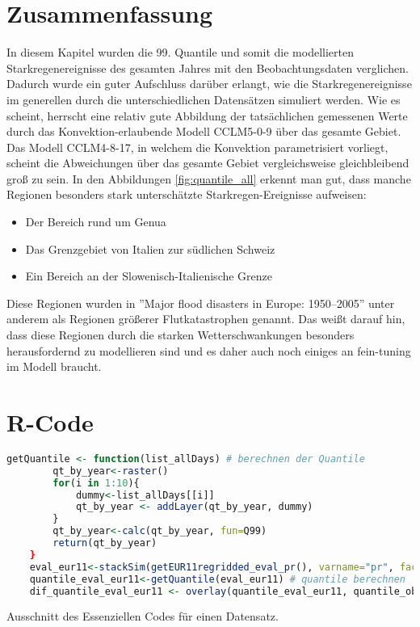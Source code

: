 \section{Zusammenfassung}
In diesem Kapitel wurden die 99. Quantile und somit die modellierten Starkregenereignisse des gesamten Jahres mit den Beobachtungsdaten verglichen. Dadurch wurde ein guter Aufschluss darüber erlangt, wie die Starkregenereignisse im generellen durch die unterschiedlichen Datensätzen simuliert werden. Wie es scheint, herrscht eine relativ gute Abbildung der tatsächlichen gemessenen Werte durch das Konvektion-erlaubende Modell CCLM5-0-9 über das gesamte Gebiet. Das Modell CCLM4-8-17, in welchem die Konvektion parametrisiert vorliegt, scheint die Abweichungen über das gesamte Gebiet vergleichsweise gleichbleibend groß zu sein. In den Abbildungen \ref{fig:quantile_all} erkennt man gut, dass manche Regionen besonders stark unterschätzte Starkregen-Ereignisse aufweisen: 
\begin{itemize}
	\item Der Bereich rund um Genua
	\item Das Grenzgebiet von Italien zur südlichen Schweiz
	\item Ein Bereich an der Slowenisch-Italienische Grenze
\end{itemize}
Diese Regionen wurden in ''Major flood disasters in Europe: 1950–2005'' \cite{barredo_major_2007} unter anderem als Regionen größerer Flutkatastrophen genannt. Das weißt darauf hin, dass diese Regionen durch die starken Wetterschwankungen besonders herausfordernd zu modellieren sind und es daher auch noch einiges an fein-tuning im Modell braucht.

\section{R-Code}
\begin{lstlisting}[language = R]
	getQuantile <- function(list_allDays) # berechnen der Quantile
		qt_by_year<-raster()
		for(i in 1:10){
			dummy<-list_allDays[[i]]
			qt_by_year <- addLayer(qt_by_year, dummy)
		}
		qt_by_year<-calc(qt_by_year, fun=Q99)
		return(qt_by_year)
	}
	eval_eur11<-stackSim(getEUR11regridded_eval_pr(), varname="pr", factor=3600*24)# Modelldaten in eine Liste geben
	quantile_eval_eur11<-getQuantile(eval_eur11) # quantile berechnen
	dif_quantile_eval_eur11 <- overlay(quantile_eval_eur11, quantile_observations, fun=function(x,y){return((x - y))})# differenzen Berechnen
\end{lstlisting}
Ausschnitt des Essenziellen Codes für einen Datensatz.